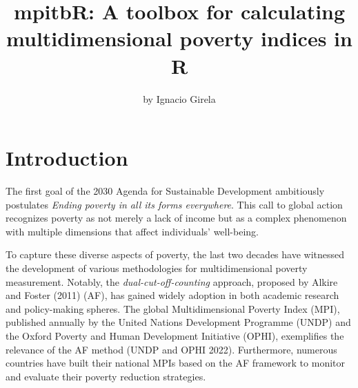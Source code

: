 \title{mpitbR: A toolbox for calculating multidimensional poverty indices in R}


\author{by Ignacio Girela}

\maketitle


\hypertarget{introduction}{%
\section{Introduction}\label{introduction}}

The first goal of the 2030 Agenda for Sustainable Development
ambitiously postulates \emph{Ending poverty in all its forms everywhere}.
This call to global action recognizes poverty as not merely a lack of
income but as a complex phenomenon with multiple dimensions that affect
individuals' well-being.

To capture these diverse aspects of poverty, the last two decades have
witnessed the development of various methodologies for multidimensional
poverty measurement. Notably, the \emph{dual-cut-off-counting} approach,
proposed by Alkire and Foster (2011) (AF), has gained widely adoption in both academic
research and policy-making spheres. The global Multidimensional Poverty
Index (MPI), published annually by the United Nations Development
Programme (UNDP) and the Oxford Poverty and Human Development Initiative
(OPHI), exemplifies the relevance of the AF method (UNDP and OPHI 2022).
Furthermore, numerous countries have built their national MPIs based on
the AF framework to monitor and evaluate their poverty reduction
strategies.

